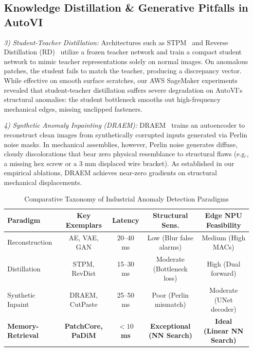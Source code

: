 \documentclass[journal,twocolumn]{IEEEtran}
\begin{document}
\subsection{Knowledge Distillation \& Generative Pitfalls in AutoVI}
\textit{3) Student-Teacher Distillation:} Architectures such as STPM~\cite{wang2021student} and Reverse Distillation (RD)~\cite{deng2022anomaly} utilize a frozen teacher network and train a compact student network to mimic teacher representations solely on normal images. On anomalous patches, the student fails to match the teacher, producing a discrepancy vector. While effective on smooth surface scratches, our AWS SageMaker experiments revealed that student-teacher distillation suffers severe degradation on AutoVI's structural anomalies: the student bottleneck smooths out high-frequency mechanical edges, missing unclipped fasteners.

\textit{4) Synthetic Anomaly Inpainting (DRAEM):} DRAEM~\cite{zavrtanik2021draem} trains an autoencoder to reconstruct clean images from synthetically corrupted inputs generated via Perlin noise masks. In mechanical assemblies, however, Perlin noise generates diffuse, cloudy discolorations that bear zero physical resemblance to structural flaws (e.g., a missing hex screw or a 3 mm displaced wire bracket). As established in our empirical ablations, DRAEM achieves near-zero gradients on structural mechanical displacements.

\begin{table}[t]
\caption{Comparative Taxonomy of Industrial Anomaly Detection Paradigms}
\label{tab:taxonomy}
\centering
\scriptsize
\begin{tabular}{lcccc}
\toprule
\textbf{Paradigm} & \textbf{Key Exemplars} & \textbf{Latency} & \textbf{Structural Sens.} & \textbf{Edge NPU Feasibility} \\
\midrule
Reconstruction & AE, VAE, GAN & 20--40 ms & Low (Blur false alarms) & Medium (High MACs) \\
Distillation & STPM, RevDist & 15--30 ms & Moderate (Bottleneck loss) & High (Dual forward) \\
Synthetic Inpaint & DRAEM, CutPaste & 25--50 ms & Poor (Perlin mismatch) & Moderate (UNet decoder) \\
\textbf{Memory-Retrieval} & \textbf{PatchCore, PaDiM} & \textbf{$<10$ ms} & \textbf{Exceptional (NN Search)} & \textbf{Ideal (Linear NN Search)} \\
\bottomrule
\end{tabular}
\end{table}
\end{document}
